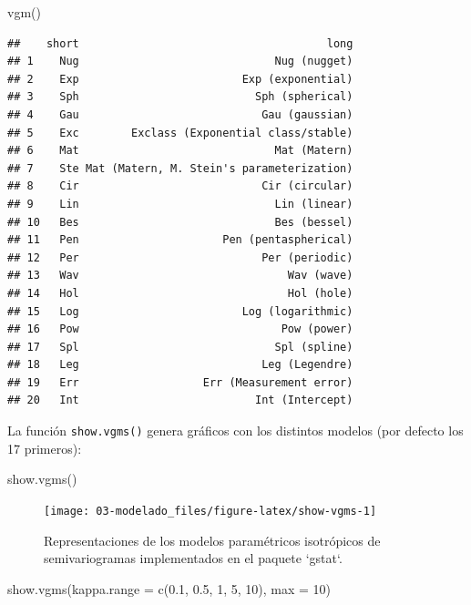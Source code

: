 \documentclass[
  spanish,
]{book}
\newenvironment{Shaded}{\begin{snugshade}}{\end{snugshade}}
\newcommand{\AttributeTok}[1]{\textcolor[rgb]{0.77,0.63,0.00}{#1}}
\newcommand{\DecValTok}[1]{\textcolor[rgb]{0.00,0.00,0.81}{#1}}
\newcommand{\FloatTok}[1]{\textcolor[rgb]{0.00,0.00,0.81}{#1}}
\newcommand{\FunctionTok}[1]{\textcolor[rgb]{0.00,0.00,0.00}{#1}}
\newcommand{\NormalTok}[1]{#1}
\theoremstyle{break}
\begin{document}
\begin{Shaded}
\begin{Highlighting}[]
\FunctionTok{vgm}\NormalTok{()}
\end{Highlighting}
\end{Shaded}

\begin{verbatim}
##    short                                      long
## 1    Nug                              Nug (nugget)
## 2    Exp                         Exp (exponential)
## 3    Sph                           Sph (spherical)
## 4    Gau                            Gau (gaussian)
## 5    Exc        Exclass (Exponential class/stable)
## 6    Mat                              Mat (Matern)
## 7    Ste Mat (Matern, M. Stein's parameterization)
## 8    Cir                            Cir (circular)
## 9    Lin                              Lin (linear)
## 10   Bes                              Bes (bessel)
## 11   Pen                      Pen (pentaspherical)
## 12   Per                            Per (periodic)
## 13   Wav                                Wav (wave)
## 14   Hol                                Hol (hole)
## 15   Log                         Log (logarithmic)
## 16   Pow                               Pow (power)
## 17   Spl                              Spl (spline)
## 18   Leg                            Leg (Legendre)
## 19   Err                   Err (Measurement error)
## 20   Int                           Int (Intercept)
\end{verbatim}

La función \texttt{show.vgms()} genera gráficos con los distintos modelos (por defecto los 17 primeros):

\begin{Shaded}
\begin{Highlighting}[]
\FunctionTok{show.vgms}\NormalTok{()}
\end{Highlighting}
\end{Shaded}

\begin{figure}[!htb]

{\centering \texttt{[image: 03-modelado\_files/figure-latex/show-vgms-1]} 

}

\caption{Representaciones de los modelos paramétricos isotrópicos de semivariogramas implementados en el paquete `gstat`.}\label{fig:show-vgms}
\end{figure}

\begin{Shaded}
\begin{Highlighting}[]
\FunctionTok{show.vgms}\NormalTok{(}\AttributeTok{kappa.range =} \FunctionTok{c}\NormalTok{(}\FloatTok{0.1}\NormalTok{, }\FloatTok{0.5}\NormalTok{, }\DecValTok{1}\NormalTok{, }\DecValTok{5}\NormalTok{, }\DecValTok{10}\NormalTok{), }\AttributeTok{max =} \DecValTok{10}\NormalTok{)}
\end{Highlighting}
\end{Shaded}
\end{document}
